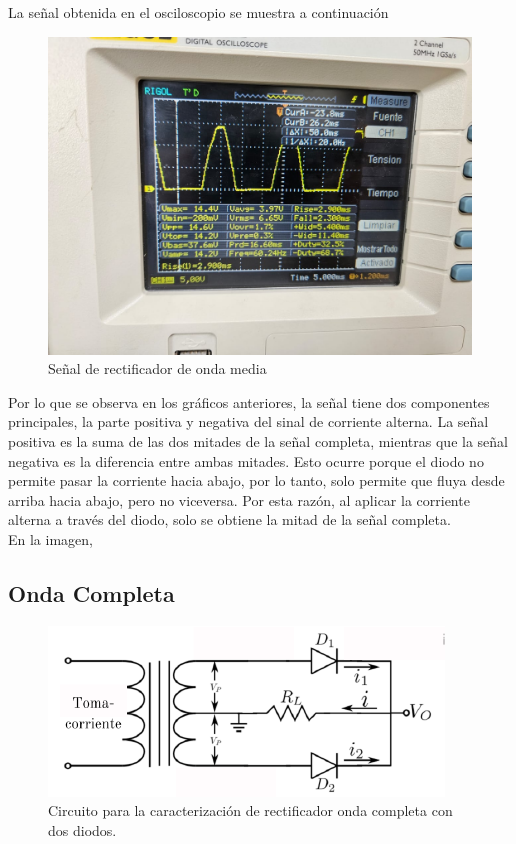 \documentclass[10pt,letterpaper]{article}
\begin{document}
La señal obtenida en el osciloscopio se muestra a continuación

\begin{figure}[H]
    \centering
    \includegraphics[scale=0.4]{Osc_OndaMedia.jpg}
    \caption{Señal de rectificador de onda media}
    \label{SeñalMedia}
\end{figure}

Por lo que se observa en los gráficos anteriores, la señal tiene dos componentes principales,
la parte positiva y negativa del sinal de corriente alterna. La señal positiva es la suma de las
dos mitades de la señal completa, mientras que la señal negativa es la diferencia entre ambas
mitades. Esto ocurre porque el diodo no permite pasar la corriente hacia abajo, por lo tanto, solo
permite que fluya desde arriba hacia abajo, pero no viceversa. Por esta razón, al aplicar la
corriente alterna a través del diodo, solo se obtiene la mitad de la señal completa.\\

En la imagen, 



\subsection{Onda Completa}


\begin{figure}[H]
	\centering
	\includegraphics[scale=1]{OndaCompleta2.png}
	\caption{Circuito para la caracterización de rectificador onda completa con dos diodos.}
	\label{fig:enter-label}
\end{figure}
\end{document}
